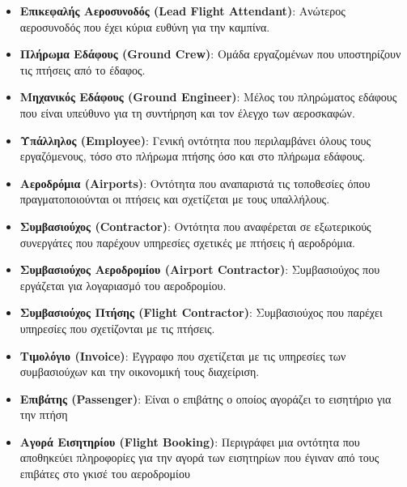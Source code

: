 \documentclass{article}
\begin{document}
\begin{itemize}
    \item \textbf{Επικεφαλής Αεροσυνοδός (Lead Flight Attendant)}: Ανώτερος αεροσυνοδός που έχει κύρια ευθύνη για την καμπίνα.
    \item \textbf{Πλήρωμα Εδάφους (Ground Crew)}: Ομάδα εργαζομένων που υποστηρίζουν τις πτήσεις από το έδαφος.
    \item \textbf{Μηχανικός Εδάφους (Ground Engineer)}: Μέλος του πληρώματος εδάφους που είναι υπεύθυνο για τη συντήρηση και τον έλεγχο των αεροσκαφών.
    \item \textbf{Υπάλληλος (Employee)}: Γενική οντότητα που περιλαμβάνει όλους τους εργαζόμενους, τόσο στο πλήρωμα πτήσης όσο και στο πλήρωμα εδάφους.
    \item \textbf{Αεροδρόμια (Airports)}: Οντότητα που αναπαριστά τις τοποθεσίες όπου πραγματοποιούνται οι πτήσεις και σχετίζεται με τους υπαλλήλους.
    \item \textbf{Συμβασιούχος (Contractor)}: Οντότητα που αναφέρεται σε εξωτερικούς συνεργάτες που παρέχουν υπηρεσίες σχετικές με πτήσεις ή αεροδρόμια.
    \item \textbf{Συμβασιούχος Αεροδρομίου (Airport Contractor)}: Συμβασιούχος που εργάζεται για λογαριασμό του αεροδρομίου.
    \item \textbf{Συμβασιούχος Πτήσης (Flight Contractor)}: Συμβασιούχος που παρέχει υπηρεσίες που σχετίζονται με τις πτήσεις.
    \item \textbf{Τιμολόγιο (Invoice)}: Έγγραφο που σχετίζεται με τις υπηρεσίες των συμβασιούχων και την οικονομική τους διαχείριση.
    \item \textbf{Επιβάτης (Passenger)}: Είναι ο επιβάτης ο οποίος αγοράζει το εισητήριο για την πτήση
    \item \textbf{Αγορά Εισητηρίου (Flight Booking)}: Περιγράφει μια οντότητα που αποθηκεύει πληροφορίες για την αγορά των εισητηρίων που έγιναν από τους επιβάτες στο γκισέ του αεροδρομίου
\end{itemize}
\end{document}
